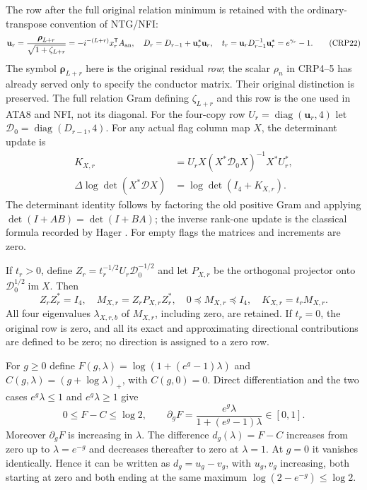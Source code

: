 The row after the full original relation minimum is retained with
the ordinary-transpose convention of NTG/NFI:
\[
\mathbf u_r=\frac{\boldsymbol\rho_{L+r}}{\sqrt{1+\zeta_{L+r}}}
   =-i^{-(L+r)}x_r^{\mathsf T}A_{\rm an},\quad
D_r=D_{r-1}+\mathbf u_r^*\mathbf u_r,\quad
t_r=\mathbf u_rD_{r-1}^{-1}\mathbf u_r^*=e^{\gamma_r}-1.\tag{CRP22}
\]
The symbol $\boldsymbol\rho_{L+r}$ here is the original residual \emph{row};
the scalar $\rho_n$ in CRP4--5 has already served only to specify the
conductor matrix. Their original distinction is preserved.
The full relation Gram defining $\zeta_{L+r}$ and this row is the
one used in ATA8 and NFI, not its diagonal. For the four-copy row
$U_r=\operatorname{diag}(\mathbf u_r,4)$ let
$\mathcal D_0=\operatorname{diag}(D_{r-1},4)$.
For any actual flag column map $X$, the determinant update is
\[
\begin{split}
K_{X,r}&=U_rX(X^*\mathcal D_0X)^{-1}X^*U_r^*,\\
\Delta\log\det(X^*\mathcal D X)&=\log\det(I_4+K_{X,r}).
\end{split}\tag{CRP23}
\]
The determinant identity follows by factoring the old positive Gram
and applying $\det(I+AB)=\det(I+BA)$; the inverse rank-one update is
the classical formula recorded by Hager \cite[p.~221, (2)]{human:hager1989}.
For empty flags the matrices and increments are zero.

If $t_r>0$, define
$Z_r=t_r^{-1/2}U_r\mathcal D_0^{-1/2}$ and let $P_{X,r}$ be the
orthogonal projector onto $\mathcal D_0^{1/2}\operatorname{im}X$.
Then
\[
Z_rZ_r^*=I_4,\quad M_{X,r}=Z_rP_{X,r}Z_r^*,\quad
0\preceq M_{X,r}\preceq I_4,\quad K_{X,r}=t_rM_{X,r}.
\tag{CRP24}
\]
All four eigenvalues $\lambda_{X,r,b}$ of $M_{X,r}$, including zero,
are retained. If $t_r=0$, the original row is zero, and all its exact
and approximating directional contributions are defined to be zero;
no direction is assigned to a zero row.

For $g\ge0$ define $F(g,\lambda)=\log(1+(e^g-1)\lambda)$ and
$C(g,\lambda)=(g+\log\lambda)_+$, with $C(g,0)=0$.
Direct differentiation and the two cases $e^g\lambda\le1$ and
$e^g\lambda\ge1$ give
\[
0\le F-C\le\log2,\qquad
\partial_gF=\frac{e^g\lambda}{1+(e^g-1)\lambda}\in[0,1].
\tag{CRP25}
\]
Moreover $\partial_gF$ is increasing in $\lambda$. The difference
$d_g(\lambda)=F-C$ increases from zero up to
$\lambda=e^{-g}$ and decreases thereafter to zero at $\lambda=1$.
At $g=0$ it vanishes identically. Hence it can be written as
$d_g=u_g-v_g$, with $u_g,v_g$ increasing, both starting at zero and
both ending at the same maximum $\log(2-e^{-g})\le\log2$.

